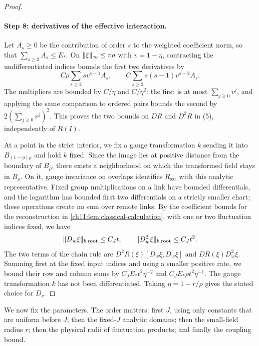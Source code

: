\begin{proof}
\paragraph{Step 8: derivatives of the effective interaction.}
Let $A_s\ge0$ be the contribution of order $s$ to the weighted coefficient norm, so that $\sum_{s\ge2}A_s\le E_*$. On $\lVert \xi\rVert_\infty\le v\rho$ with $v=1-\eta$, contracting the undifferentiated indices bounds the first two derivatives by
\[
 C\rho\sum_{s\ge2}sv^{s-1}A_s,\qquad C\sum_{s\ge2}s(s-1)v^{s-2}A_s.
\]
The multipliers are bounded by $C/\eta$ and $C/\eta^2$: the first is at most $\sum_{j\ge0}v^j$, and applying the same comparison to ordered pairs bounds the second by $2(\sum_{j\ge0}v^j)^2$. This proves the two bounds on $DR$ and $D^2R$ in (5), independently of $R(I)$.

At a point in the strict interior, we fix a gauge transformation $k$ sending it into $B_{(1-\eta)\rho}$ and hold $k$ fixed. Since the image lies at positive distance from the boundary of $B_\rho$, there exists a neighborhood on which the transformed field stays in $B_\rho$. On it, gauge invariance on overlaps identifies $R_{\mathrm{sat}}$ with this analytic representative. Fixed group multiplications on a link have bounded differentials, and the logarithm has bounded first two differentials on a strictly smaller chart; these operations create no sum over remote links. By the coefficient bounds for the reconstruction in \cref{ch11:lem:classical-calculation}, with one or two fluctuation indices fixed, we have
\[
 \lVert D_w\xi\rVert_{b,\mathrm{root}}\le C_Jt,\qquad\lVert D_w^2\xi\rVert_{b,\mathrm{root}}\le C_Jt^2.
\]
The two terms of the chain rule are $D^2R(\xi)[D_w\xi,D_w\xi]$ and $DR(\xi)D_w^2\xi$. Summing first at the fixed input indices and using a smaller positive rate, we bound their row and column sums by $C_JE_*t^2\eta^{-2}$ and $C_JE_*\rho t^2\eta^{-1}$. The gauge transformation $k$ has not been differentiated. Taking $\eta=1-r/\rho$ gives the stated choice for $D_r$.
\end{proof}

We now fix the parameters. The order matters: first $J$, using only constants that are uniform before $J$; then the fixed-$J$ analytic domains; then the small-field radius $r$; then the physical radii of fluctuation products; and finally the coupling bound.

